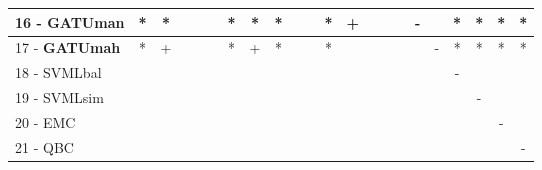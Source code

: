 \begin{table}[h]
\begin{center}
\begin{tabular}{lcc|cc|cc|cc|cc|cc|cc|cc|cc|cc|c}
16 - \textbf{GATUman}	& * & * &   &   &   & * & * & * &   &   & * & + &   &   &   & - &   & * & * & * & * \\ \hline
17 - \textbf{GATUmah}	& * & + &   &   &   & * & + & * &   &   & * &   &   &   &   &   & - & * & * & * & * \\
18 - SVMLbal	&   &   &   &   &   &   &   &   &   &   &   &   &   &   &   &   &   & - &   &   &   \\ \hline
19 - SVMLsim	&   &   &   &   &   &   &   &   &   &   &   &   &   &   &   &   &   &   & - &   &   \\
20 - EMC  	&   &   &   &   &   &   &   &   &   &   &   &   &   &   &   &   &   &   &   & - &   \\ \hline
21 - QBC  	&   &   &   &   &   &   &   &   &   &   &   &   &   &   &   &   &   &   &   &   & - \\\end{tabular}
\label{stratsALCKappaFriedC4.5wRedux}
\end{center}
\end{table}